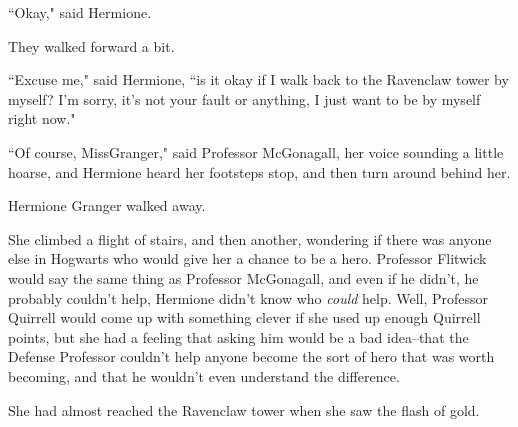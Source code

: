 ``Okay," said Hermione.

They walked forward a bit.

``Excuse me," said Hermione, ``is it okay if I walk back to the Ravenclaw tower by myself? I'm sorry, it's not your fault or anything, I just want to be by myself right now."

``Of course, Miss\?Granger," said Professor McGonagall, her voice sounding a little hoarse, and Hermione heard her footsteps stop, and then turn around behind her.

Hermione Granger walked away.

She climbed a flight of stairs, and then another, wondering if there was anyone else in Hogwarts who would give her a chance to be a hero. Professor Flitwick would say the same thing as Professor McGonagall, and even if he didn't, he probably couldn't help, Hermione didn't know who \emph{could} help. Well, Professor Quirrell would come up with something clever if she used up enough Quirrell points, but she had a feeling that asking him would be a bad idea\---that the Defense Professor couldn't help anyone become the sort of hero that was worth becoming, and that he wouldn't even understand the difference.

She had almost reached the Ravenclaw tower when she saw the flash of gold.

